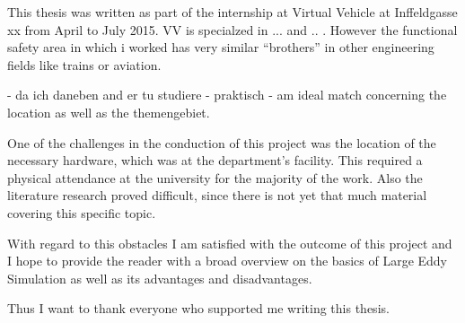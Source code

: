 This thesis was written as part of the internship at Virtual Vehicle at Inffeldgasse xx from April to July 2015. VV is specialzed in ... and .. . However the functional safety area in which i worked has very similar ``brothers'' in other engineering fields like trains or aviation. 

- da ich daneben and er tu studiere - praktisch
- am ideal match concerning the location as well as the themengebiet.


One of the challenges in the conduction of this project was the location of the necessary hardware, which was at the department's facility. This required a physical attendance at the university for the majority of the work. Also the literature research proved difficult, since there is not yet that much material covering this specific topic.

With regard to this obstacles I am satisfied with the outcome of this project and I hope to provide the reader with a broad overview on the basics of Large Eddy Simulation as well as its advantages and disadvantages.

Thus I want to thank everyone who supported me writing this thesis.